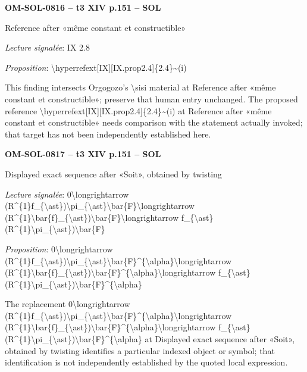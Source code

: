 \par\noindent\textbf{OM-SOL-0816 -- t3 XIV p.151 -- SOL}\par
Reference after «même constant et constructible»\par
\emph{Lecture signalée}: IX 2.8\par
\emph{Proposition}: \textbackslash{}hyperrefext[IX][IX.prop2.4]\{2.4\}\textasciitilde{}(i)\par
This finding intersects Orgogozo's \textbackslash{}sisi material at Reference after «même constant et constructible»; preserve that human entry unchanged. The proposed reference \textbackslash{}hyperrefext[IX][IX.prop2.4]\{2.4\}\textasciitilde{}(i) at Reference after «même constant et constructible» needs comparison with the statement actually invoked; that target has not been independently established here.\par
\par\noindent\textbf{OM-SOL-0817 -- t3 XIV p.151 -- SOL}\par
Displayed exact sequence after «Soit», obtained by twisting\par
\emph{Lecture signalée}: 0\textbackslash{}longrightarrow (R\textasciicircum{}\{1\}f\_\{\textbackslash{}ast\})\textbackslash{}pi\_\{\textbackslash{}ast\}\textbackslash{}bar\{F\}\textbackslash{}longrightarrow (R\textasciicircum{}\{1\}\textbackslash{}bar\{f\}\_\{\textbackslash{}ast\})\textbackslash{}bar\{F\}\textbackslash{}longrightarrow f\_\{\textbackslash{}ast\}(R\textasciicircum{}\{1\}\textbackslash{}pi\_\{\textbackslash{}ast\})\textbackslash{}bar\{F\}\par
\emph{Proposition}: 0\textbackslash{}longrightarrow (R\textasciicircum{}\{1\}f\_\{\textbackslash{}ast\})\textbackslash{}pi\_\{\textbackslash{}ast\}\textbackslash{}bar\{F\}\textasciicircum{}\{\textbackslash{}alpha\}\textbackslash{}longrightarrow (R\textasciicircum{}\{1\}\textbackslash{}bar\{f\}\_\{\textbackslash{}ast\})\textbackslash{}bar\{F\}\textasciicircum{}\{\textbackslash{}alpha\}\textbackslash{}longrightarrow f\_\{\textbackslash{}ast\}(R\textasciicircum{}\{1\}\textbackslash{}pi\_\{\textbackslash{}ast\})\textbackslash{}bar\{F\}\textasciicircum{}\{\textbackslash{}alpha\}\par
The replacement 0\textbackslash{}longrightarrow (R\textasciicircum{}\{1\}f\_\{\textbackslash{}ast\})\textbackslash{}pi\_\{\textbackslash{}ast\}\textbackslash{}bar\{F\}\textasciicircum{}\{\textbackslash{}alpha\}\textbackslash{}longrightarrow (R\textasciicircum{}\{1\}\textbackslash{}bar\{f\}\_\{\textbackslash{}ast\})\textbackslash{}bar\{F\}\textasciicircum{}\{\textbackslash{}alpha\}\textbackslash{}longrightarrow f\_\{\textbackslash{}ast\}(R\textasciicircum{}\{1\}\textbackslash{}pi\_\{\textbackslash{}ast\})\textbackslash{}bar\{F\}\textasciicircum{}\{\textbackslash{}alpha\} at Displayed exact sequence after «Soit», obtained by twisting identifies a particular indexed object or symbol; that identification is not independently established by the quoted local expression.\par
